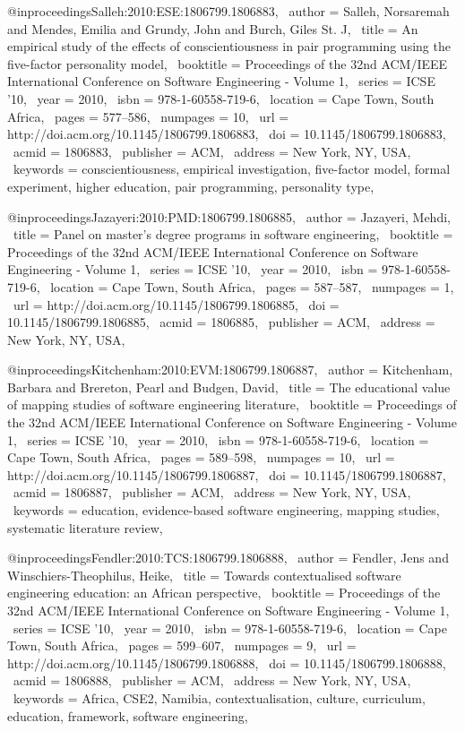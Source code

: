 @inproceedings{Salleh:2010:ESE:1806799.1806883,
 author = {Salleh, Norsaremah and Mendes, Emilia and Grundy, John and Burch, Giles St. J},
 title = {An empirical study of the effects of conscientiousness in pair programming using the five-factor personality model},
 booktitle = {Proceedings of the 32nd ACM/IEEE International Conference on Software Engineering - Volume 1},
 series = {ICSE '10},
 year = {2010},
 isbn = {978-1-60558-719-6},
 location = {Cape Town, South Africa},
 pages = {577--586},
 numpages = {10},
 url = {http://doi.acm.org/10.1145/1806799.1806883},
 doi = {10.1145/1806799.1806883},
 acmid = {1806883},
 publisher = {ACM},
 address = {New York, NY, USA},
 keywords = {conscientiousness, empirical investigation, five-factor model, formal experiment, higher education, pair programming, personality type},
} 

@inproceedings{Jazayeri:2010:PMD:1806799.1806885,
 author = {Jazayeri, Mehdi},
 title = {Panel on master's degree programs in software engineering},
 booktitle = {Proceedings of the 32nd ACM/IEEE International Conference on Software Engineering - Volume 1},
 series = {ICSE '10},
 year = {2010},
 isbn = {978-1-60558-719-6},
 location = {Cape Town, South Africa},
 pages = {587--587},
 numpages = {1},
 url = {http://doi.acm.org/10.1145/1806799.1806885},
 doi = {10.1145/1806799.1806885},
 acmid = {1806885},
 publisher = {ACM},
 address = {New York, NY, USA},
} 

@inproceedings{Kitchenham:2010:EVM:1806799.1806887,
 author = {Kitchenham, Barbara and Brereton, Pearl and Budgen, David},
 title = {The educational value of mapping studies of software engineering literature},
 booktitle = {Proceedings of the 32nd ACM/IEEE International Conference on Software Engineering - Volume 1},
 series = {ICSE '10},
 year = {2010},
 isbn = {978-1-60558-719-6},
 location = {Cape Town, South Africa},
 pages = {589--598},
 numpages = {10},
 url = {http://doi.acm.org/10.1145/1806799.1806887},
 doi = {10.1145/1806799.1806887},
 acmid = {1806887},
 publisher = {ACM},
 address = {New York, NY, USA},
 keywords = {education, evidence-based software engineering, mapping studies, systematic literature review},
} 

@inproceedings{Fendler:2010:TCS:1806799.1806888,
 author = {Fendler, Jens and Winschiers-Theophilus, Heike},
 title = {Towards contextualised software engineering education: an African perspective},
 booktitle = {Proceedings of the 32nd ACM/IEEE International Conference on Software Engineering - Volume 1},
 series = {ICSE '10},
 year = {2010},
 isbn = {978-1-60558-719-6},
 location = {Cape Town, South Africa},
 pages = {599--607},
 numpages = {9},
 url = {http://doi.acm.org/10.1145/1806799.1806888},
 doi = {10.1145/1806799.1806888},
 acmid = {1806888},
 publisher = {ACM},
 address = {New York, NY, USA},
 keywords = {Africa, CSE2, Namibia, contextualisation, culture, curriculum, education, framework, software engineering},
} 

